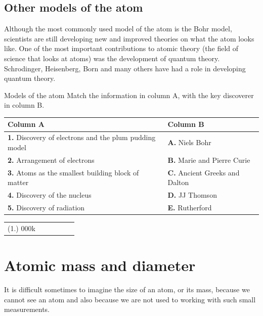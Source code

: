             \subsection*{Other models of the atom}
            \nopagebreak
            \label{m38756*eip-993}
Although the most commonly used model of the atom is the Bohr model, scientists are still developing new and improved theories on what the atom looks like. One of the most important contributions to atomic theory (the field of science that looks at atoms) was the development of quantum theory. Schrodinger, Heisenberg, Born and many others have had a role in developing quantum theory.  
\par \label{m38756*eip-179}
            \begin{exercises}{Models of the atom}
            \nopagebreak \vspace{-1cm}
            \label{m38756*eip-786}Match the information in column A, with the key discoverer in column B.
          \begin{table}[H]
        \begin{center}
      \label{m38756*eip-551}
      \begin{tabular}{|l|l|}\hline
        \textbf{Column A} &
        \textbf{Column B} \\ \hline
        \textbf{1.} Discovery of electrons and the plum pudding model &
        \textbf{A.} Niels Bohr \\ \hline
        \textbf{2.} Arrangement of electrons &
        \textbf{B.} Marie and Pierre Curie  \\ \hline
        \textbf{3.} Atoms as the smallest building block of matter &
        \textbf{C.} Ancient Greeks and Dalton \\ \hline
        \textbf{4.} Discovery of the nucleus &
        \textbf{D.} JJ Thomson \\ \hline
        \textbf{5.} Discovery of radiation &
        \textbf{E.} Rutherford \\ \hline
    \end{tabular}
      \end{center}
\end{table}
\practiceinfo
 \begin{tabular}[h]{cccccc}
 (1.) 000k  & \end{tabular}
\end{exercises}
            \section{Atomic mass and diameter}
            \nopagebreak
            \label{m38756*id254850}It is difficult sometimes to imagine the size of an atom, or its mass, because we cannot see an atom and also because we are not used to working with such small measurements. 
